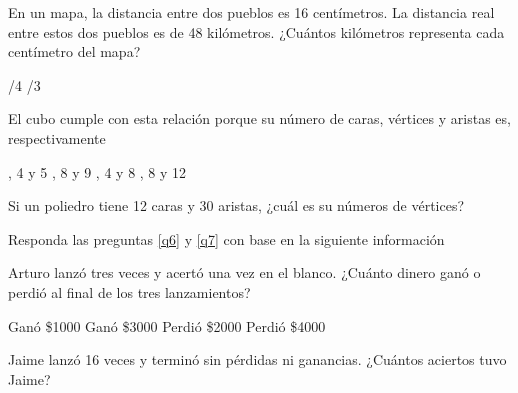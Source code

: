 \documentclass[10pt,letterpaper,addpoints]{exam}
\begin{document}
\begin{questions}
\begin{multicols}{2}
   \question En un mapa, la distancia entre dos pueblos es 16 centímetros. La distancia real entre estos dos pueblos es de 48 kilómetros. ¿Cuántos kilómetros representa cada centímetro del mapa?

\begin{oneparchoices}
    /4
    /3
\end{oneparchoices}
  \question \label{q4} El cubo cumple con esta relación porque su número de caras, vértices y aristas es, respectivamente

\begin{oneparchoices}
      , 4 y 5
      , 8 y 9
      , 4 y 8
      , 8 y 12
\end{oneparchoices}
  \question \label{q5} Si un poliedro tiene 12 caras y 30 aristas, ¿cuál es su números de vértices?

\begin{oneparchoices}
\end{oneparchoices}
Responda las preguntas \ref{q6} y \ref{q7} con base en la siguiente información
  
\question \label{q6} Arturo lanzó tres veces y acertó una vez en el blanco. ¿Cuánto dinero ganó o perdió al final de los tres lanzamientos?
\begin{choices}
    \CorrectChoice Ganó \$1000
    \choice Ganó \$3000
    \choice Perdió \$2000
    \choice Perdió \$4000
\end{choices}
\question \label{q7} Jaime lanzó 16 veces y terminó sin pérdidas ni ganancias. ¿Cuántos aciertos tuvo Jaime?

\begin{oneparchoices}
\end{oneparchoices}
\end{multicols}
\end{questions}
\end{document}
